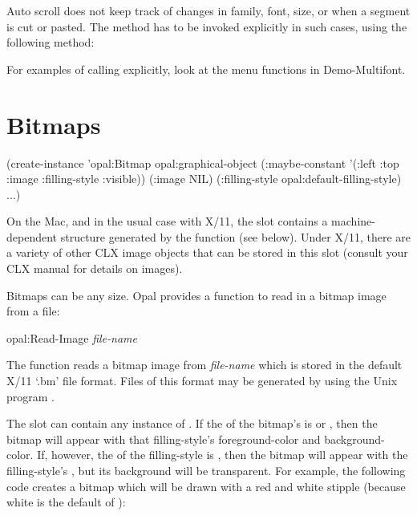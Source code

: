 Auto scroll does not keep track of changes in family, font, size, or
when a segment is cut or pasted.  The  method has to be
invoked explicitly in such cases, using the following method:


For examples of calling  explicitly, look at the menu
functions in Demo-Multifont.


\section{Bitmaps}
\label{bitmap-sec}

\begin{programexample}
 
(create-instance 'opal:Bitmap opal:graphical-object
  (:maybe-constant '(:left :top :image :filling-style :visible))
  (:image NIL)
  (:filling-style opal:default-filling-style)
  ...)
\end{programexample}
On the Mac, and in the
usual case with X/11, the  slot contains a machine-dependent
structure generated by the function  (see below).
Under X/11, there are a variety of other CLX image objects that can be
stored in this slot (consult your CLX manual for details on images).

Bitmaps can be any size.  Opal provides a function to read in a bitmap
image from a file:
\begin{programexample}
opal:Read-Image {\it file-name}\value{function}
\end{programexample}
The  function reads a bitmap image from {\it file-name} which
is stored in the default X/11 `.bm' file format.  Files of this format may
be generated by using the Unix program .

The  slot can contain any instance of
.  If the  of the bitmap's
 is  or , then the bitmap
will appear with that filling-style's foreground-color and background-color.
If, however, the  of the filling-style is ,
then the bitmap will appear with the filling-style's ,
but its background will be transparent.  For example, the following
code creates a bitmap which will be drawn with a red and white stipple
(because white is the default  of
):  

